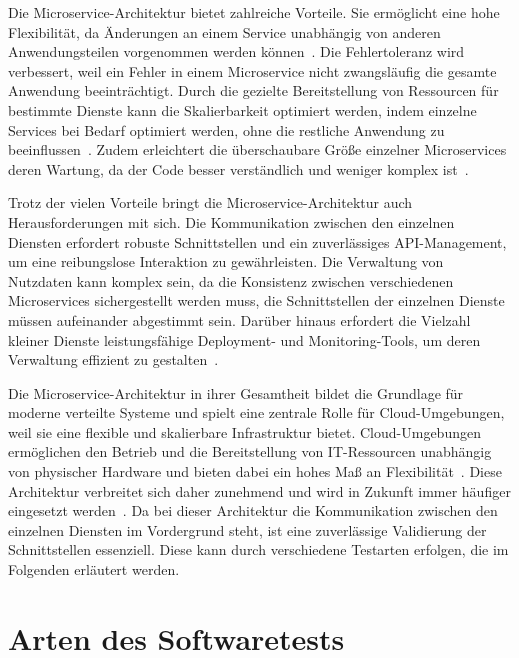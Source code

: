 Die Microservice-Architektur bietet zahlreiche Vorteile.
Sie ermöglicht eine hohe Flexibilität, da Änderungen an einem Service unabhängig von anderen Anwendungsteilen vorgenommen werden können~\cite{haroMicroserviceAPIs2023}.
Die Fehlertoleranz wird verbessert, weil ein Fehler in einem Microservice nicht zwangsläufig die gesamte Anwendung beeinträchtigt.
Durch die gezielte Bereitstellung von Ressourcen für bestimmte Dienste kann die Skalierbarkeit optimiert werden, indem einzelne Services bei Bedarf optimiert werden, ohne die restliche Anwendung zu beeinflussen~\cite{newmanMonolithMicroservices2019}.
Zudem erleichtert die überschaubare Größe einzelner Microservices deren Wartung, da der Code besser verständlich und weniger komplex ist~\cite{newmanBuildingMicroservices2021}.

Trotz der vielen Vorteile bringt die Microservice-Architektur auch Herausforderungen mit sich.
Die Kommunikation zwischen den einzelnen Diensten erfordert robuste Schnittstellen und ein zuverlässiges \gls{API}-Management, um eine reibungslose Interaktion zu gewährleisten.
Die Verwaltung von Nutzdaten kann komplex sein, da die Konsistenz zwischen verschiedenen Microservices sichergestellt
werden muss, \dahe die Schnittstellen der einzelnen Dienste müssen aufeinander abgestimmt sein.
Darüber hinaus erfordert die Vielzahl kleiner Dienste leistungsfähige \gls{Deployment}- und Monitoring-Tools, um deren Verwaltung effizient zu gestalten~\cite{newmanMonolithMicroservices2019}.

Die Microservice-Architektur in ihrer Gesamtheit bildet die Grundlage für moderne verteilte Systeme und spielt eine zentrale Rolle für Cloud-Umgebungen, weil sie eine flexible und skalierbare Infrastruktur bietet.
Cloud-Umgebungen ermöglichen den Betrieb und die Bereitstellung von IT-Ressourcen unabhängig von physischer Hardware und bieten dabei ein hohes Maß an Flexibilität~\cite{freewheelbiz-uiteamCloudNativeApplicationArchitecture2024}.
Diese Architektur verbreitet sich daher zunehmend und wird in Zukunft immer häufiger eingesetzt werden~\cite{richardsonMicroservicesPatterns2018}.
Da bei dieser Architektur die Kommunikation zwischen den einzelnen Diensten im Vordergrund steht, ist eine zuverlässige Validierung der Schnittstellen essenziell.
Diese kann durch verschiedene Testarten erfolgen, die im Folgenden erläutert werden.

\section{Arten des Softwaretests}\label{sec:foundation_testing}

